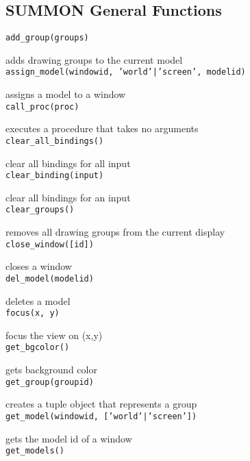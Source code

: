 \subsection{ SUMMON General Functions }

{\tt add\_group(groups) }

adds drawing groups to the current model \\


{\tt assign\_model(windowid, 'world'|'screen', modelid) }

assigns a model to a window \\


{\tt call\_proc(proc) }

executes a procedure that takes no arguments \\


{\tt clear\_all\_bindings() }

clear all bindings for all input \\


{\tt clear\_binding(input) }

clear all bindings for an input \\


{\tt clear\_groups() }

removes all drawing groups from the current display \\


{\tt close\_window([id]) }

closes a window \\


{\tt del\_model(modelid) }

deletes a model \\


{\tt focus(x, y) }

focus the view on (x,y) \\


{\tt get\_bgcolor() }

gets background color \\


{\tt get\_group(groupid) }

creates a tuple object that represents a group \\


{\tt get\_model(windowid, ['world'|'screen']) }

gets the model id of a window \\


{\tt get\_models() }

